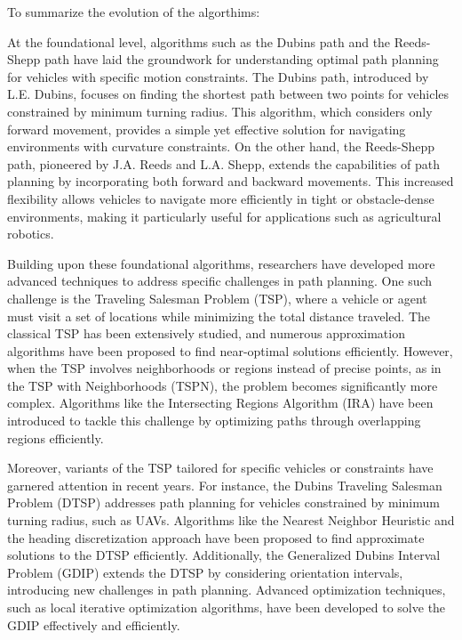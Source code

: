 \newpage

To summarize the evolution of the algorthims:

\vspace*{6mm}

At the foundational level, algorithms such as the Dubins path and the Reeds-Shepp path have laid the groundwork for understanding optimal path planning for vehicles with specific motion constraints. The Dubins path, introduced by L.E. Dubins, focuses on finding the shortest path between two points for vehicles constrained by minimum turning radius. This algorithm, which considers only forward movement, provides a simple yet effective solution for navigating environments with curvature constraints. On the other hand, the Reeds-Shepp path, pioneered by J.A. Reeds and L.A. Shepp, extends the capabilities of path planning by incorporating both forward and backward movements. This increased flexibility allows vehicles to navigate more efficiently in tight or obstacle-dense environments, making it particularly useful for applications such as agricultural robotics.

\vspace*{6mm}

Building upon these foundational algorithms, researchers have developed more advanced techniques to address specific challenges in path planning. One such challenge is the Traveling Salesman Problem (TSP), where a vehicle or agent must visit a set of locations while minimizing the total distance traveled. The classical TSP has been extensively studied, and numerous approximation algorithms have been proposed to find near-optimal solutions efficiently. However, when the TSP involves neighborhoods or regions instead of precise points, as in the TSP with Neighborhoods (TSPN), the problem becomes significantly more complex. Algorithms like the Intersecting Regions Algorithm (IRA) have been introduced to tackle this challenge by optimizing paths through overlapping regions efficiently.

\vspace*{6mm}

Moreover, variants of the TSP tailored for specific vehicles or constraints have garnered attention in recent years. For instance, the Dubins Traveling Salesman Problem (DTSP) addresses path planning for vehicles constrained by minimum turning radius, such as UAVs. Algorithms like the Nearest Neighbor Heuristic and the heading discretization approach have been proposed to find approximate solutions to the DTSP efficiently. Additionally, the Generalized Dubins Interval Problem (GDIP) extends the DTSP by considering orientation intervals, introducing new challenges in path planning. Advanced optimization techniques, such as local iterative optimization algorithms, have been developed to solve the GDIP effectively and efficiently. 

